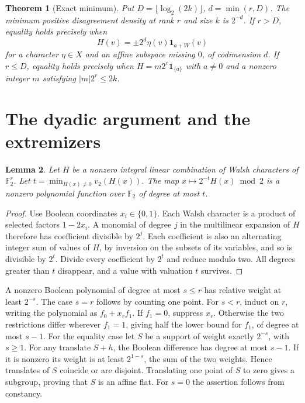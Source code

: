 \documentclass[11pt,letterpaper]{article}
\newtheorem{theorem}{Theorem}
\newtheorem{lemma}[theorem]{Lemma}
\newcommand{\F}{\mathbb F_2}
\newcommand{\one}{\mathbf 1}
\begin{document}
\begin{theorem}[Exact minimum]\label{minimum}
Put \(D=\lfloor\log_2(2k)\rfloor\), \(d=\min(r,D)\). The minimum positive disagreement density at rank \(r\) and size \(k\) is \(2^{-d}\). If \(r>D\), equality holds precisely when
\[
 H(v)=\pm 2^d\eta(v)\one_{a+W}(v)
\]
for a character \(\eta\in X\) and an affine subspace missing \(0\), of codimension \(d\). If \(r\le D\), equality holds precisely when \(H=m2^r\one_{\{a\}}\) with \(a\ne0\) and a nonzero integer \(m\) satisfying \(|m|2^r\le2k\).
\end{theorem}

\newpage
\section{The dyadic argument and the extremizers}
\begin{lemma}\label{dyadic}
Let \(H\) be a nonzero integral linear combination of Walsh characters of \(\F^r\). Let \(t=\min_{H(x)\ne0}v_2(H(x))\). The map \(x\mapsto 2^{-t}H(x)\bmod 2\) is a nonzero polynomial function over \(\F\) of degree at most \(t\).
\end{lemma}
\begin{proof}
Use Boolean coordinates \(x_i\in\{0,1\}\). Each Walsh character is a product of selected factors \(1-2x_i\). A monomial of degree \(j\) in the multilinear expansion of \(H\) therefore has coefficient divisible by \(2^j\). Each coefficient is also an alternating integer sum of values of \(H\), by inversion on the subsets of its variables, and so is divisible by \(2^t\). Divide every coefficient by \(2^t\) and reduce modulo two. All degrees greater than \(t\) disappear, and a value with valuation \(t\) survives.
\end{proof}
A nonzero Boolean polynomial of degree at most \(s\le r\) has relative weight at least \(2^{-s}\). The case \(s=r\) follows by counting one point. For \(s<r\), induct on \(r\), writing the polynomial as \(f_0+x_rf_1\). If \(f_1=0\), suppress \(x_r\). Otherwise the two restrictions differ wherever \(f_1=1\), giving half the lower bound for \(f_1\), of degree at most \(s-1\). For the equality case let \(S\) be a support of weight exactly \(2^{-s}\), with \(s\ge1\). For any translate \(S+h\), the Boolean difference has degree at most \(s-1\). If it is nonzero its weight is at least \(2^{1-s}\), the sum of the two weights. Hence translates of \(S\) coincide or are disjoint. Translating one point of \(S\) to zero gives a subgroup, proving that \(S\) is an affine flat. For \(s=0\) the assertion follows from constancy.
\end{document}
